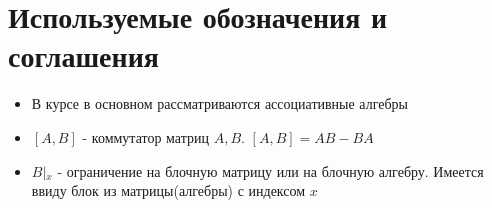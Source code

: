 \documentclass[a4paper, 14pt]{extarticle}
\theoremstyle{definition}
\begin{document}
\newpage
\section{Используемые обозначения и соглашения}

\begin{itemize}
	\item В курсе в основном рассматриваются ассоциативные алгебры
	\item \([A, B]\) - коммутатор матриц \(A, B\). \([A, B] = AB - BA\)
	\item \(B \left|_{x} \right.\) - ограничение на блочную матрицу или на блочную алгебру. Имеется ввиду блок из матрицы(алгебры) с индексом \(x\)
\end{itemize}
\end{document}
